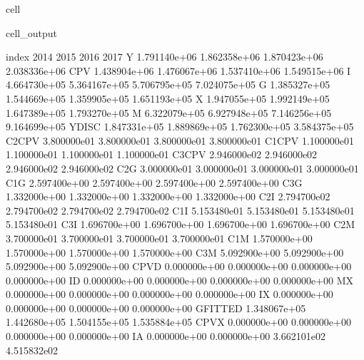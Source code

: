 \documentclass[letterpaper,10pt,english]{jupyterBook}
\begin{document}
\begin{sphinxuseclass}{cell}
\begin{sphinxVerbatimOutput}
\begin{sphinxuseclass}{cell_output}
\begin{sphinxVerbatim}[commandchars=\\\{\}]
index               2014          2015          2016          2017  \PYGZbs{}
Y           1.791140e+06  1.862358e+06  1.870423e+06  2.038336e+06   
CPV         1.438904e+06  1.476067e+06  1.537410e+06  1.549515e+06   
I           4.664730e+05  5.364167e+05  5.706795e+05  7.024075e+05   
G           1.385327e+05  1.544669e+05  1.359905e+05  1.651193e+05   
X           1.947055e+05  1.992149e+05  1.647389e+05  1.793270e+05   
M           6.322079e+05  6.927948e+05  7.146256e+05  9.164699e+05   
YDISC       1.847331e+05  1.889869e+05  1.762300e+05  3.584375e+05   
C2\PYGZus{}CPV      3.800000e\PYGZhy{}01  3.800000e\PYGZhy{}01  3.800000e\PYGZhy{}01  3.800000e\PYGZhy{}01   
C1\PYGZus{}CPV     \PYGZhy{}1.100000e\PYGZhy{}01 \PYGZhy{}1.100000e\PYGZhy{}01 \PYGZhy{}1.100000e\PYGZhy{}01 \PYGZhy{}1.100000e\PYGZhy{}01   
C3\PYGZus{}CPV      2.946000e\PYGZhy{}02  2.946000e\PYGZhy{}02  2.946000e\PYGZhy{}02  2.946000e\PYGZhy{}02   
C2\PYGZus{}G        3.000000e\PYGZhy{}01  3.000000e\PYGZhy{}01  3.000000e\PYGZhy{}01  3.000000e\PYGZhy{}01   
C1\PYGZus{}G       \PYGZhy{}2.597400e+00 \PYGZhy{}2.597400e+00 \PYGZhy{}2.597400e+00 \PYGZhy{}2.597400e+00   
C3\PYGZus{}G        1.332000e+00  1.332000e+00  1.332000e+00  1.332000e+00   
C2\PYGZus{}I        2.794700e\PYGZhy{}02  2.794700e\PYGZhy{}02  2.794700e\PYGZhy{}02  2.794700e\PYGZhy{}02   
C1\PYGZus{}I       \PYGZhy{}5.153480e\PYGZhy{}01 \PYGZhy{}5.153480e\PYGZhy{}01 \PYGZhy{}5.153480e\PYGZhy{}01 \PYGZhy{}5.153480e\PYGZhy{}01   
C3\PYGZus{}I        1.696700e+00  1.696700e+00  1.696700e+00  1.696700e+00   
C2\PYGZus{}M        3.700000e\PYGZhy{}01  3.700000e\PYGZhy{}01  3.700000e\PYGZhy{}01  3.700000e\PYGZhy{}01   
C1\PYGZus{}M       \PYGZhy{}1.570000e+00 \PYGZhy{}1.570000e+00 \PYGZhy{}1.570000e+00 \PYGZhy{}1.570000e+00   
C3\PYGZus{}M        5.092900e+00  5.092900e+00  5.092900e+00  5.092900e+00   
CPV\PYGZus{}D       0.000000e+00  0.000000e+00  0.000000e+00  0.000000e+00   
I\PYGZus{}D         0.000000e+00  0.000000e+00  0.000000e+00  0.000000e+00   
M\PYGZus{}X         0.000000e+00  0.000000e+00  0.000000e+00  0.000000e+00   
I\PYGZus{}X         0.000000e+00  0.000000e+00  0.000000e+00  0.000000e+00   
G\PYGZus{}FITTED    1.348067e+05  1.442680e+05  1.504155e+05  1.535884e+05   
CPV\PYGZus{}X       0.000000e+00  0.000000e+00  0.000000e+00  0.000000e+00   
I\PYGZus{}A         0.000000e+00  0.000000e+00  3.662101e\PYGZhy{}02  4.515832e\PYGZhy{}02   

\end{sphinxVerbatim}
\end{sphinxuseclass}
\end{sphinxVerbatimOutput}
\end{sphinxuseclass}
\end{document}
